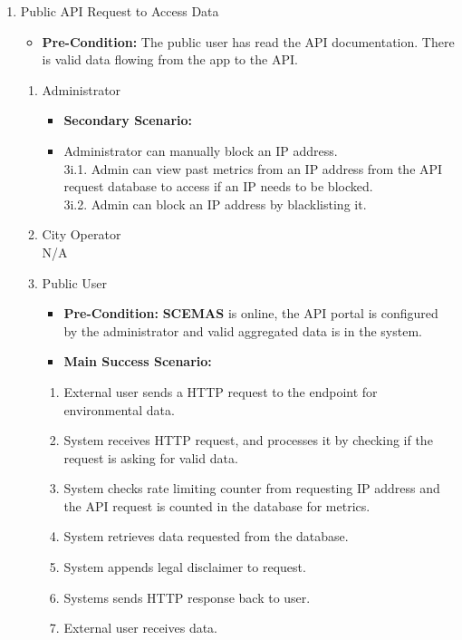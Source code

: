 \documentclass[]{article}
\begin{document}
\begin{enumerate}[{\bf BE1.}]
	\item Public API Request to Access Data
		\begin{itemize}
			\item[] {\bf Pre-Condition:} The public user has read the API documentation. There is valid data flowing from the app to the API.
		\end{itemize}
		\begin{enumerate}[{\bf VP1.}]
		\item Administrator
			\begin{itemize}
				\item[] {\bf Secondary Scenario:}
				\item[3i.] Administrator can manually block an IP address. \\
				\hspace{1cm}3i.1. Admin can view past metrics from an IP address from the API request database to access if an IP needs to be blocked. \\
				\hspace{1cm}3i.2. Admin can block an IP address by blacklisting it.
			\end{itemize}
		\item City Operator \\
			N/A
		\item Public User
			\begin{itemize}
				\item[] {\bf Pre-Condition:} \textbf{SCEMAS} is online, the API portal is configured by the administrator and valid aggregated data is in the system.
				\item[] {\bf Main Success Scenario:}
			\end{itemize}
			\begin{enumerate}[1.]
				\item External user sends a HTTP request to the endpoint for environmental data.
				\item System receives HTTP request, and processes it by checking if the request is asking for valid data.
				\item System checks rate limiting counter from requesting IP address and the API request is counted in the database for metrics.
				\item System retrieves data requested from the database.
				\item System appends legal disclaimer to request.
				\item Systems sends HTTP response back to user.
				\item External user receives data.

\end{enumerate}
\end{enumerate}
\end{enumerate}
\end{document}
